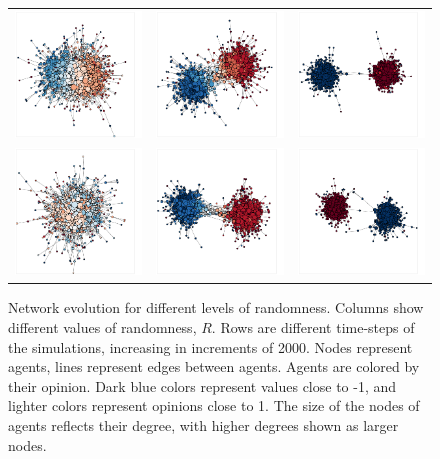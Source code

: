 \documentclass[11pt]{article}
\begin{document}
\begin{center}
\begin{figure}[H]
\begin{tabular}{ccc}
    \includegraphics[width=.15\linewidth]{../plots/networks/network_example_R0.1_8000.pdf} & \includegraphics[width=.15\linewidth]{../plots/networks/network_example_R0.3_8000.pdf} & \includegraphics[width=.15\linewidth]{../plots/networks/network_example_R0.5_8000.pdf}\\  
    \includegraphics[width=.15\linewidth]{../plots/networks/network_example_R0.1_10000.pdf} & \includegraphics[width=.15\linewidth]{../plots/networks/network_example_R0.3_10000.pdf} & \includegraphics[width=.15\linewidth]{../plots/networks/network_example_R0.5_10000.pdf}\\  
    \end{tabular} 
    \caption{Network evolution for different levels of randomness. Columns show different values of randomness, $R$. Rows are different time-steps of the simulations, increasing in increments of 2000. Nodes represent agents, lines represent edges between agents. Agents are colored by their opinion. Dark blue colors represent values close to -1, and lighter colors represent opinions close to 1. The size of the nodes of agents reflects their degree, with higher degrees shown as larger nodes.} 
    \label{fig:networks} 
    \end{figure} 
\end{center} 
\end{document}
